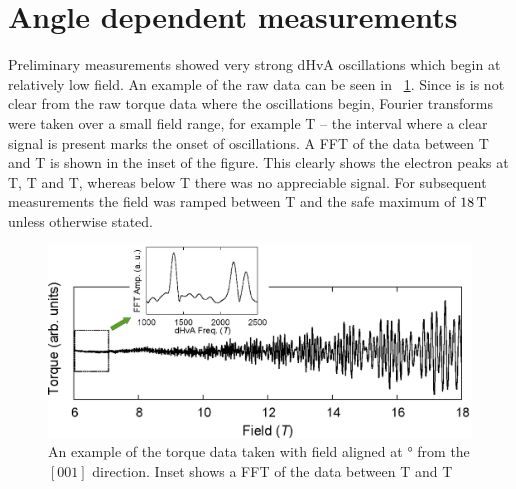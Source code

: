 
\section{Angle dependent measurements}
    \label{Sec:3:AngleDependentMeasurements}

Preliminary measurements showed very strong dHvA oscillations which begin at relatively low field.  An example of the raw data can be seen in \fig~\ref{Fig:3:RawOscillations}. Since is is not clear from the raw torque data where the oscillations begin, Fourier transforms were taken over a small field range, for example \unit[1]{T} -- the interval where a clear signal is present marks the onset of oscillations. A FFT of the data between \unit[6]{T} and \unit[7]{T} is shown in the inset of the figure. This clearly shows the electron peaks at \unit[1370]{T}, \unit[2175]{T} and \unit[2343]{T}, whereas below \unit[6]{T} there was no appreciable signal. For subsequent measurements the field was ramped between \unit[6]{T} and the safe maximum of $\unit[18]{T}$ unless otherwise stated.
\begin{figure}[h!]
    \begin{center}
        \includegraphics[scale=0.7]{Chapter3-dHvABaFe2P2/Figures/AngleDepMeasurements/RawOscillations/RawOscillations}
        \caption{An example of the torque data taken with field aligned at \unit[9]{\degree} from the $[001]$ direction. Inset shows a FFT of the data between \unit[6]{T} and \unit[8]{T}}
        \label{Fig:3:RawOscillations}
    \end{center}
\end{figure}


